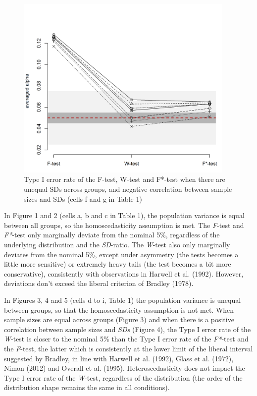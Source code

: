 \documentclass[man,floatsintext]{apa6}
\begin{document}
\begin{figure}
\includegraphics[width=400px]{Rmarkdown folder/Rmarkdown inputs/Fig1E} \caption{Type I error rate of the F-test, W-test and F*-test when there are unequal SDs across groups, and negative correlation between sample sizes and SDs (cells f and g in Table 1)}\label{fig:unnamed-chunk-5}
\end{figure}

In Figure 1 and 2 (cells a, b and c in Table 1), the population variance is equal between all groups, so the homoscedasticity assumption is met. The \emph{F}-test and \emph{F*}-test only marginally deviate from the nominal 5\%, regardless of the underlying distribution and the \emph{SD}-ratio. The \emph{W}-test also only marginally deviates from the nominal 5\%, except under asymmetry (the tests becomes a little more sensitive) or extremely heavy tails (the test becomes a bit more conservative), consistently with observations in Harwell et al. (1992). However, deviations don't exceed the liberal criterion of Bradley (1978).

In Figures 3, 4 and 5 (cells d to i, Table 1) the population variance is unequal between groups, so that the homoscedasticity assumption is not met. When sample sizes are equal across groups (Figure 3) and when there is a positive correlation between sample sizes and \emph{SDs} (Figure 4), the Type I error rate of the \emph{W}-test is closer to the nominal 5\% than the Type I error rate of the \emph{F*}-test and the \emph{F}-test, the latter which is consistently at the lower limit of the liberal interval suggested by Bradley, in line with Harwell et al. (1992), Glass et al. (1972), Nimon (2012) and Overall et al. (1995). Heteroscedasticity does not impact the Type I error rate of the \emph{W}-test, regardless of the distribution (the order of the distribution shape remains the same in all conditions).
\end{document}
